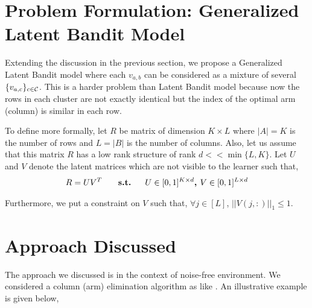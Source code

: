 \documentclass[twoside]{article}
\begin{document}
\section{Problem Formulation: Generalized Latent Bandit Model}
	
	Extending the discussion in the previous section, we propose a Generalized Latent Bandit model where each $v_{a,b}$ can be considered as a mixture of several $\lbrace v_{a,c}\rbrace_{c\in\mathcal{C}}$. This is a harder problem than Latent Bandit model because now the rows in each cluster are not exactly identical but the index of the optimal arm (column) is similar in each row.
	
	To define more formally, let $R$ be matrix of  dimension $K\times L$ where $|A|=K$ is the number of rows and $L=|B|$ is the number of columns. Also, let us assume that this matrix  $R$ has a low rank structure of rank $d << \min\lbrace L,K\rbrace$. Let $U$ and $V$ denote the latent matrices which are not visible to the learner such that,
\begin{align*}
	R = UV^{T} \textbf{ \hspace*{4mm}   s.t.   \hspace*{4mm}} U\in [ 0,1 ]^{K\times d} \textbf{, } V\in  [0,1]^{L\times d} 
\end{align*}	  
	
	Furthermore, we put a constraint on $V$ such that, $\forall j\in [L]$, $ ||V(j,:)||_1 \leq 1$. 
	
	
%	
	
	
\section{Approach Discussed}

The approach we discussed is in the context of noise-free environment. We considered a column (arm) elimination algorithm as like \citet{auer2010ucb}. An illustrative example is given below, 
\end{document}
